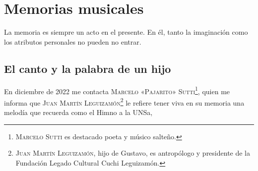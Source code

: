 \chapter{Memorias musicales}
\label{cap:memorias}

La memoria es siempre un acto en el presente. En él, tanto la imaginación como los atributos personales no pueden no entrar.

\section{El canto y la palabra de un hijo}
\label{sec:palabra-canto}

En diciembre de 2022 me contacta \textsc{Marcelo «Pajarito» Sutti}\footnote{\textsc{Marcelo Sutti} es destacado poeta y músico salteño.}, quien me informa que \textsc{Juan Martín Leguizamón}\footnote{\textsc{Juan Martín Leguizamón}, hijo de Gustavo, es antropólogo y presidente de la Fundación Legado Cultural Cuchi Leguizamón.} le refiere tener viva en su memoria una melodía que recuerda como el Himno a la UNSa,
